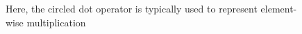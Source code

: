 \documentclass[11pt]{article}
\begin{document}
\begin{figure}[H]
    \centering
    \caption*{Here, the circled dot operator is typically used to represent element-wise multiplication}
\end{figure}
\end{document}
